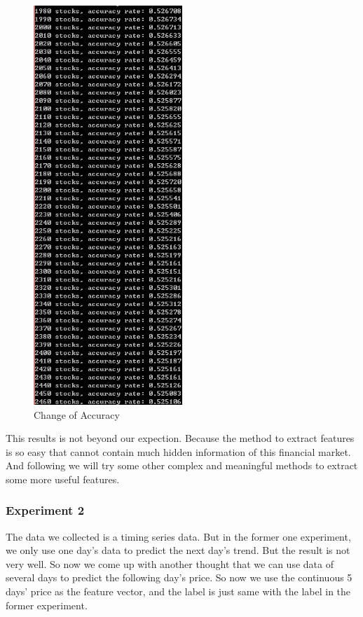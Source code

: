 \begin{figure}
\centering
\includegraphics[width=0.5\textwidth]{accuracy1.png}
\caption{\label{fig:accuracy1}Change of Accuracy}
\end{figure}

This results is not beyond our expection. Because the method to extract features is so easy that cannot contain much hidden information of this financial market. And following we will try some other complex and meaningful methods to extract some more useful features.

\subsubsection{Experiment 2}
The data we collected is a timing series data. But in the former one experiment, we only use one day's data to predict the next day's trend. But the result is not very well. So now we come up with another thought that we can use data of several days to predict the following day's price. So now we use the continuous 5 days' price as the feature vector, and the label is just same with the label in the former experiment.

